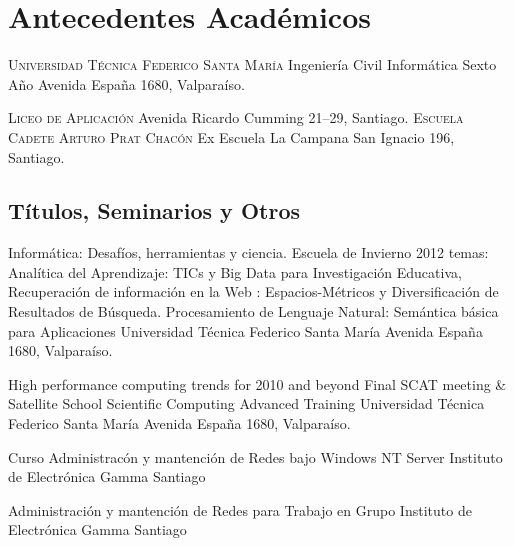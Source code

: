 \section{Antecedentes Acad\'emicos}
	{\textsc{Universidad T\'ecnica Federico Santa Mar\'ia}}
	{Ingenier\'ia Civil Inform\'atica}{ Sexto A\~no}
	{}
	{Avenida España 1680, Valparaíso.}
	

	{\textsc{Liceo de Aplicaci\'on}}
	{}
	{}
	{}
	{Avenida Ricardo Cumming 21--29, Santiago.}
	{\textsc{Escuela Cadete Arturo Prat Chac\'on}}
	{Ex Escuela La Campana}
	{}
	{}
	{San Ignacio 196, Santiago.}
\subsection{T\'itulos, Seminarios y Otros}

	{Informática: Desafíos, herramientas y ciencia.}
	{Escuela de Invierno 2012}
	{temas: Analítica del Aprendizaje: TICs y Big Data para Investigación Educativa, Recuperación de información en la Web : Espacios-Métricos y Diversificación de Resultados de Búsqueda. Procesamiento de Lenguaje Natural: Semántica básica para Aplicaciones}
	{Universidad T\'ecnica Federico Santa Mar\'ia}
	{Avenida España 1680, Valpara\'iso.}
	
	
	{High performance computing trends for 2010 and beyond}
	{Final SCAT meeting \& Satellite School}
	{Scientific Computing Advanced Training}
	{Universidad T\'ecnica Federico Santa Mar\'ia}
	{Avenida España 1680, Valpara\'iso.}

	{Curso Administrac\'on y mantenci\'on de Redes bajo Windows NT Server}
	{Instituto de Electr\'onica Gamma}
	{}
	{}
	{Santiago}
	
	{Administraci\'on y mantenci\'on de Redes para Trabajo en Grupo}
	{Instituto de Electr\'onica Gamma}
	{}
	{}
	{Santiago}
	
	

	
